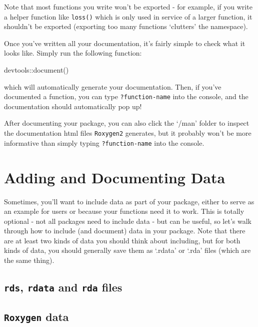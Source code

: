 \documentclass[
]{book}
\newenvironment{Shaded}{\begin{snugshade}}{\end{snugshade}}
\newcommand{\FunctionTok}[1]{\textcolor[rgb]{0.00,0.00,0.00}{#1}}
\newcommand{\NormalTok}[1]{#1}
\newcommand{\SpecialCharTok}[1]{\textcolor[rgb]{0.00,0.00,0.00}{#1}}
\begin{document}
Note that most functions you write won't be exported - for example, if you write a helper function like \texttt{loss()} which is only used in service of a larger function, it shouldn't be exported (exporting too many functions `clutters' the namespace).

Once you've written all your documentation, it's fairly simple to check what it looks like. Simply run the following function:

\begin{Shaded}
\begin{Highlighting}[]
\NormalTok{devtools}\SpecialCharTok{::}\FunctionTok{document}\NormalTok{()}
\end{Highlighting}
\end{Shaded}

which will automatically generate your documentation. Then, if you've documented a function, you can type \texttt{?function-name} into the console, and the documentation should automatically pop up!

After documenting your package, you can also click the `/man' folder to inspect the documentation html files \texttt{Roxygen2} generates, but it probably won't be more informative than simply typing \texttt{?function-name} into the console.

\hypertarget{adding-and-documenting-data}{%
\section{Adding and Documenting Data}\label{adding-and-documenting-data}}

Sometimes, you'll want to include data as part of your package, either to serve as an example for users or because your functions need it to work. This is totally optional - not all packages need to include data - but can be useful, so let's walk through how to include (and document) data in your package. Note that there are at least two kinds of data you should think about including, but for both kinds of data, you should generally save them as `.rdata' or `.rda' files (which are the same thing).

\hypertarget{rds-rdata-and-rda-files}{%
\subsection{\texorpdfstring{\texttt{rds}, \texttt{rdata} and \texttt{rda} files}{rds, rdata and rda files}}\label{rds-rdata-and-rda-files}}

\hypertarget{roxygen-data}{%
\subsection{\texorpdfstring{\texttt{Roxygen} data}{Roxygen data}}\label{roxygen-data}}
\end{document}
